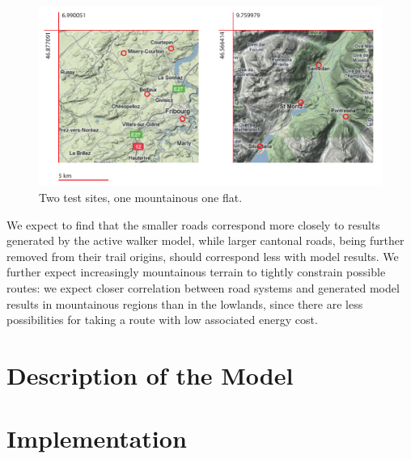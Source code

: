\documentclass[a4paper, DIV11, abstracton]{scrartcl}
\begin{document}
\begin{figure}[tbp]
	\includegraphics[width=\linewidth]{../figures/site}
	\caption{Two test sites, one mountainous one flat.}
	\label{fig:site}
\end{figure}

We expect to find that the smaller roads correspond more closely to results generated by the active walker model, while larger cantonal roads, being further removed from their trail origins, should correspond less with model results. We further expect increasingly mountainous terrain to tightly constrain possible routes: we expect closer correlation between road systems and generated model results in mountainous regions than in the lowlands, since there are less possibilities for taking a route with low associated energy cost.


\section{Description of the Model}





\section{Implementation}

\end{document}
